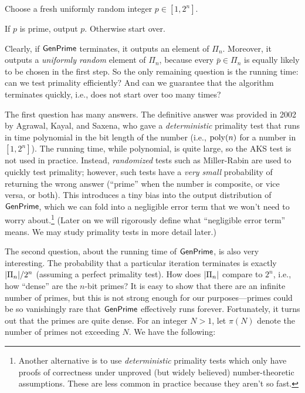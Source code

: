 \documentclass[11pt]{article}
\begin{document}
\begin{algorithm}
  \caption{Algorithm $\algo{GenPrime}(1^{n})$ for sampling a uniformly
    random $n$-bit prime.}
  \label{alg:genprime}
  \begin{algorithmic}[1]
    \STATE Choose a fresh uniformly random integer $p \in [1, 2^{n}]$.

    \STATE If $p$ is prime, output $p$.  Otherwise start over.
  \end{algorithmic}
\end{algorithm}

Clearly, if $\mathsf{GenPrime}$ terminates, it outputs an element of
$\Pi_{n}$.  Moreover, it outputs a \emph{uniformly random} element of
$\Pi_{n}$, because every $\bar{p} \in \Pi_{n}$ is equally likely to be
chosen in the first step.  So the only remaining question is the
running time: can we test primality efficiently?  And can we guarantee
that the algorithm terminates quickly, i.e., does not start over too
many times?

The first question has many answers.  The definitive answer was
provided in 2002 by Agrawal, Kayal, and Saxena, who gave a
\emph{deterministic} primality test that runs in time polynomial in
the bit length of the number (i.e., $\operatorname{poly}(n)$ for a number in
$[1,2^{n}]$).  The running time, while polynomial, is quite large, so
the AKS test is not used in practice.  Instead, \emph{randomized}
tests such as Miller-Rabin are used to quickly test primality;
however, such tests have a \emph{very small} probability of returning
the wrong answer (``prime'' when the number is composite, or vice
versa, or both).  This introduces a tiny bias into the output
distribution of $\mathsf{GenPrime}$, which we can fold into a negligible
error term that we won't need to worry about.\footnote{Another
  alternative is to use \emph{deterministic} primality tests which
  only have proofs of correctness under unproved (but widely believed)
  number-theoretic assumptions.  These are less common in practice
  because they aren't so fast.}  (Later on we will rigorously define
what ``negligible error term'' means.  We may study primality tests in
more detail later.)

The second question, about the running time of $\mathsf{GenPrime}$, is
also very interesting.  The probability that a particular iteration
terminates is exactly $\lvert\Pi_{n}\rvert / 2^{n}$ (assuming a perfect
primality test).  How does $\lvert\Pi_{n}\rvert$ compare to $2^{n}$, i.e.,
how ``dense'' are the $n$-bit primes?  It is easy to show that there
are an infinite number of primes, but this is not strong enough for
our purposes---primes could be so vanishingly rare that
$\mathsf{GenPrime}$ effectively runs forever.  Fortunately, it turns out
that the primes are quite dense.  For an integer $N > 1$, let $\pi(N)$
denote the number of primes not exceeding $N$.  We have the following:
\end{document}
